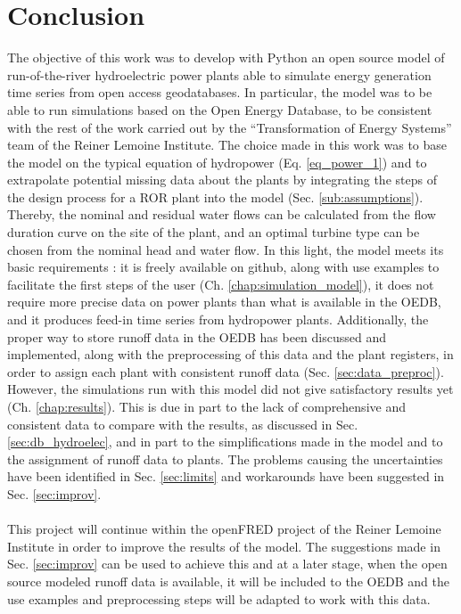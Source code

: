 \chapter{Conclusion}

The objective of this work was to develop with Python an open source model of run-of-the-river hydroelectric power plants able to simulate energy generation time series from open access geodatabases. In particular, the model was to be able to run simulations based on the Open Energy Database, to be consistent with the rest of the work carried out by the ``Transformation of Energy Systems'' team of the Reiner Lemoine Institute. \newline
The choice made in this work was to base the model on the typical equation of hydropower (Eq. \ref{eq_power_1}) and to extrapolate potential missing data about the plants by integrating the steps of the design process for a ROR plant into the model (Sec. \ref{sub:assumptions}). Thereby, the nominal and residual water flows can be calculated from the flow duration curve on the site of the plant, and an optimal turbine type can be chosen from the nominal head and water flow. In this light, the model meets its basic requirements : it is freely available on github, along with use examples to facilitate the first steps of the user (Ch. \ref{chap:simulation_model}), it does not require more precise data on power plants than what is available in the OEDB, and it produces feed-in time series from hydropower plants. Additionally, the proper way to store runoff data in the OEDB has been discussed and implemented, along with the preprocessing of this data and the plant registers, in order to assign each plant with consistent runoff data (Sec. \ref{sec:data_preproc}). \newline
However, the simulations run with this model did not give satisfactory results yet (Ch. \ref{chap:results}). This is due in part to the lack of comprehensive and consistent data to compare with the results, as discussed in Sec. \ref{sec:db_hydroelec}, and in part to the simplifications made in the model and to the assignment of runoff data to plants. The problems causing the uncertainties have been identified in Sec. \ref{sec:limits} and workarounds have been suggested in Sec. \ref{sec:improv}. \\ \\
This project will continue within the openFRED project of the Reiner Lemoine Institute in order to improve the results of the model. The suggestions made in Sec. \ref{sec:improv} can be used to achieve this and at a later stage, when the open source modeled runoff data is available, it will be included to the OEDB and the use examples and preprocessing steps will be adapted to work with this data.\newline
